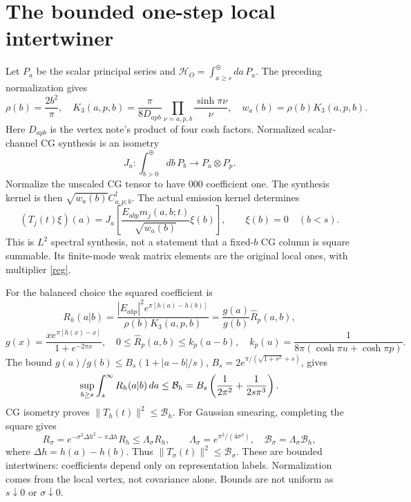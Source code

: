 \documentclass[11pt,a4paper]{article}
\newcommand{\HH}{\mathcal H}\newcommand{\MM}{\mathcal M}
\begin{document}
\newpage
\section{The bounded one-step local intertwiner}
Let $P_a$ be the scalar principal series and
$\HH_O=\int_{a\ge s}^{\oplus}da\,P_a$. The preceding normalization gives
\[
 \rho(b)=\frac{2b^2}{\pi},\quad
 K_3(a,p,b)=\frac{\pi}{8D_{apb}}
 \prod_{\nu=a,p,b}\frac{\sinh\pi\nu}{\nu},\quad
 w_a(b)=\rho(b)K_3(a,p,b).
\]
Here $D_{apb}$ is the vertex note's product of four cosh factors.
Normalized scalar-channel CG synthesis \cite{ds} is an isometry
\[
 J_a:\int_{b>0}^{\oplus}db\,P_b\longrightarrow P_a\otimes P_p .
\]
Normalize the unscaled CG tensor to have $000$ coefficient one.
The synthesis kernel is then $\sqrt{w_a(b)}C^\dagger_{a,p;b}$.
The actual emission kernel determines
\begin{equation}
 (T_j(t)\xi)(a)=
 J_a\!\left[\frac{E_{abp}m_j(a,b;t)}{\sqrt{w_a(b)}}\xi(b)\right],
 \qquad \xi(b)=0\quad(b<s).
 \label{T}
\end{equation}
This is $L^2$ spectral synthesis, not a statement that a fixed-$b$
CG column is square summable. Its finite-mode weak matrix elements
are the original local ones, with multiplier \eqref{reg}.

For the balanced choice the squared coefficient is
\[
 R_h(a|b)=\frac{|E_{abp}|^2e^{\pi[h(a)-h(b)]}}{\rho(b)K_3(a,p,b)}
         =\frac{g(a)}{g(b)}\widehat R_p(a,b),
\]
\[
 g(x)=\frac{x e^{\pi[h(x)-x]}}{1+e^{-2\pi x}},\quad
 0\le\widehat R_p(a,b)\le k_p(a-b),\quad
 k_p(u)=\frac1{8\pi(\cosh\pi u+\cosh\pi p)} .
\]
The bound $g(a)/g(b)\le B_s(1+|a-b|/s)$,
$B_s=2e^{\pi/(\sqrt{1+s^2}+s)}$, gives
\begin{equation}
 \sup_{b\ge s}\int_s^\infty R_h(a|b)\,da
 \le {\cal B}_h=B_s\left(\frac1{2\pi^2}+\frac1{2s\pi^3}\right).
 \label{B}
\end{equation}
CG isometry proves $\|T_h(t)\|^2\le\mathcal B_h$.
For Gaussian smearing, completing the square gives
\begin{equation}
 R_\sigma=e^{-\sigma^2\Delta h^2-\pi\Delta h}R_h
 \le\Lambda_\sigma R_h,\qquad
 \Lambda_\sigma=e^{\pi^2/(4\sigma^2)},\quad
 \mathcal B_\sigma=\Lambda_\sigma\mathcal B_h ,
 \label{GaussianB}
\end{equation}
where $\Delta h=h(a)-h(b)$. Thus $\|T_\sigma(t)\|^2\le\mathcal B_\sigma$.
These are bounded intertwiners: coefficients depend only on
representation labels. Normalization comes from the local vertex,
not covariance alone. Bounds are not uniform as $s\downarrow0$
or $\sigma\downarrow0$.
\end{document}
